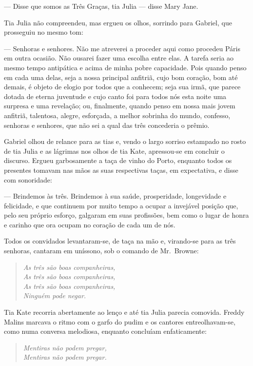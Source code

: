 --- Disse que somos as Três Graças, tia Julia --- disse Mary Jane.

Tia Julia não compreendeu, mas ergueu os olhos, sorrindo para Gabriel, que
prosseguiu no mesmo tom:

--- Senhoras e senhores.  Não me atreverei a proceder aqui como procedeu Páris
em outra ocasião.  Não ousarei fazer uma escolha entre elas.  A tarefa seria ao
mesmo tempo antipática e acima de minha pobre capacidade.  Pois quando penso em
cada uma delas, seja a nossa principal anfitriã, cujo bom coração, bom até
demais, é objeto de elogio por todos que a conhecem; seja sua irmã, que parece
dotada de eterna juventude e cujo canto foi para todos nós esta noite uma
surpresa e uma revelação; ou, finalmente, quando penso em nossa mais jovem
anfitriã, talentosa, alegre, esforçada, a melhor sobrinha do mundo, confesso,
senhoras e senhores, que não sei a qual das três concederia o prêmio.

Gabriel olhou de relance para as tias e, vendo o largo sorriso estampado no
rosto de tia Julia e as lágrimas nos olhos de tia Kate, apressou-se em concluir
o discurso.  Ergueu garbosamente a taça de vinho do Porto, enquanto todos os
presentes tomavam nas mãos as suas respectivas taças, em expectativa, e disse
com sonoridade:

--- Brindemos às três.  Brindemos à sua saúde, prosperidade, longevidade e
felicidade, e que continuem por muito tempo a ocupar a invejável posição que,
pelo seu próprio esforço, galgaram em suas profissões, bem como o lugar de
honra e carinho que ora ocupam no coração de cada um de nós.

Todos os convidados levantaram-se, de taça na mão e, virando-se para as três
senhoras, cantaram em uníssono, sob o comando de Mr.~Browne:

\begin{verse}\itshape
As três são boas companheiras,\\
As três são boas companheiras,\\
As três são boas companheiras,\\
Ninguém pode negar.
\end{verse}

Tia Kate recorria abertamente ao lenço e até tia Julia parecia comovida.
Freddy Malins marcava o ritmo com o garfo do pudim e os cantores
entreolhavam-se, como numa conversa melodiosa, enquanto concluíam
enfaticamente:

\begin{verse}\itshape
Mentiras não podem pregar,\\
Mentiras não podem pregar.
\end{verse}

